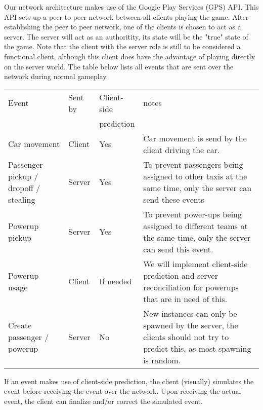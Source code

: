 Our network architecture makes use of the Google Play Services (GPS)  API. This API sets up a peer to peer network between all clients playing the game. After establishing the peer to peer network, one of the clients is chosen to act as a server. The server will act as an authoritity, its state will be the "true" state of the game. Note that the client with the server role is still to be considered a functional client, although this client does have the advantage of playing directly on the server world. The table below lists all events that are sent over the network during normal gameplay.
\begin{center}
    \begin{tabular}{ | p{3cm} | l | l | p{7cm} |}
    \hline
    Event & Sent by &  Client-side & notes\\
	  &	        & prediction  & \\ \hline
    Car movement & Client &Yes  & Car movement is send by the client driving the car. \\ \hline
    Passenger pickup / dropoff / stealing  & Server & Yes & To prevent passengers being assigned to other taxis at the same time, only the server can send these events \\ \hline
   Powerup pickup & Server & Yes & To prevent power-ups being assigned to different teams at the same time, only the server can send this event. \\ \hline
 Powerup usage & Client & If needed  & We will implement client-side prediction and server reconciliation for powerups that are in need of this. \\ \hline
Create passenger / powerup & Server & No & New instances can only be spawned by the server, the clients should not try to predict this, as most spawning is random. \\ \hline
    \end{tabular}
\end{center}


If an event makes use of client-side prediction, the client (visually) simulates the event before receiving the event over the network. Upon receiving the actual event, the client can finalize and/or correct the simulated event.